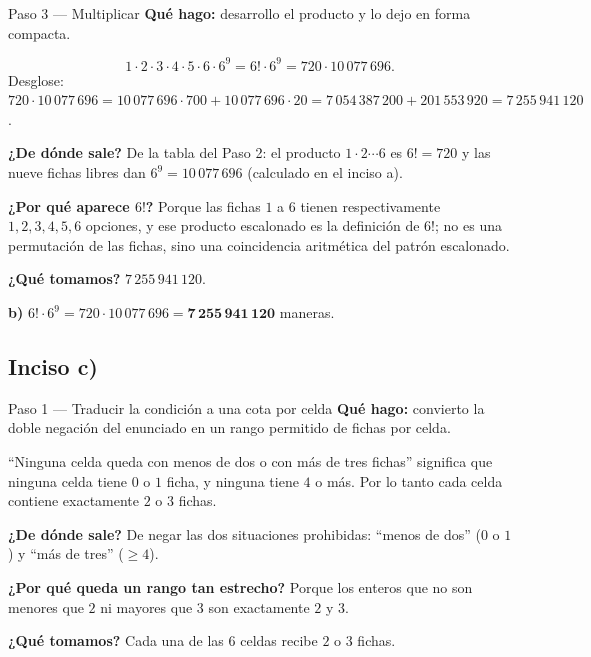 \documentclass[11pt]{article}
\begin{document}
\begin{paso}{Paso 3 --- Multiplicar}
\textbf{Qué hago:} desarrollo el producto y lo dejo en forma compacta.

\[
1\cdot 2\cdot 3\cdot 4\cdot 5\cdot 6 \cdot 6^{9} = 6!\cdot 6^{9} = 720\cdot 10\,077\,696 .
\]
Desglose: $720\cdot 10\,077\,696 = 10\,077\,696\cdot 700 + 10\,077\,696\cdot 20 = 7\,054\,387\,200 + 201\,553\,920 = 7\,255\,941\,120$.

\textbf{¿De dónde sale?} De la tabla del Paso 2: el producto $1\cdot2\cdots6$ es $6!=720$ y las nueve fichas libres dan $6^9 = 10\,077\,696$ (calculado en el inciso a).

\textbf{¿Por qué aparece $6!$?} Porque las fichas $1$ a $6$ tienen respectivamente $1,2,3,4,5,6$ opciones, y ese producto escalonado es la definición de $6!$; no es una permutación de las fichas, sino una coincidencia aritmética del patrón escalonado.

\textbf{¿Qué tomamos?} $7\,255\,941\,120$.
\end{paso}

\begin{resp}
\textbf{b)} $6!\cdot 6^{9} = 720\cdot 10\,077\,696 = \mathbf{7\,255\,941\,120}$ maneras.
\end{resp}

\subsection*{Inciso c)}

\begin{paso}{Paso 1 --- Traducir la condición a una cota por celda}
\textbf{Qué hago:} convierto la doble negación del enunciado en un rango permitido de fichas por celda.

``Ninguna celda queda con menos de dos o con más de tres fichas'' significa que ninguna celda tiene $0$ o $1$ ficha, y ninguna tiene $4$ o más. Por lo tanto cada celda contiene exactamente $2$ o $3$ fichas.

\textbf{¿De dónde sale?} De negar las dos situaciones prohibidas: ``menos de dos'' ($0$ o $1$) y ``más de tres'' ($\ge 4$).

\textbf{¿Por qué queda un rango tan estrecho?} Porque los enteros que no son menores que $2$ ni mayores que $3$ son exactamente $2$ y $3$.

\textbf{¿Qué tomamos?} Cada una de las $6$ celdas recibe $2$ o $3$ fichas.
\end{paso}
\end{document}
